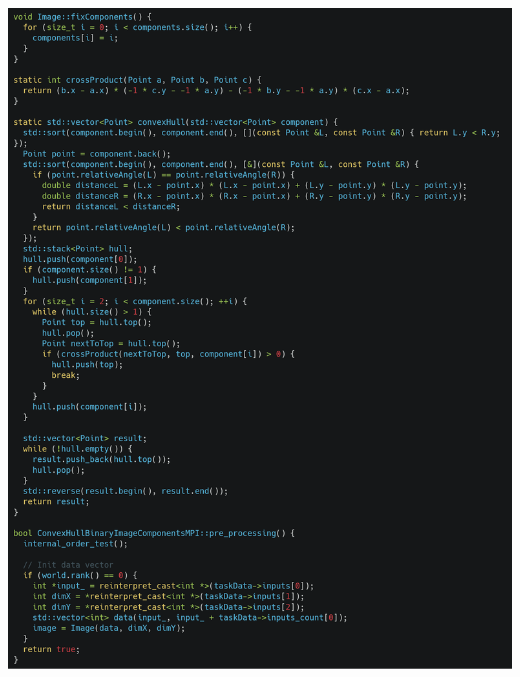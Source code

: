 \documentclass[a4paper]{article}
\begin{document}
\begin{center}
\includegraphics[width=481.95pt,height=632.1pt]{report-img005.png}
\end{center}
\end{document}
